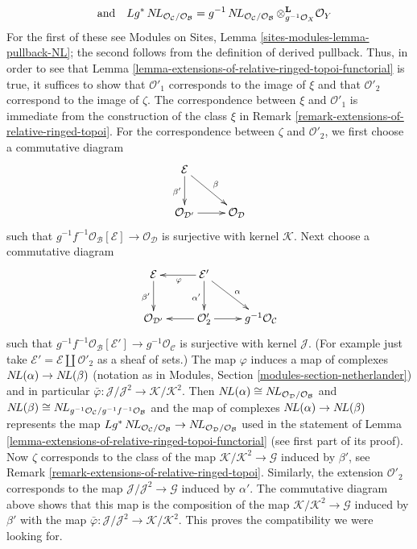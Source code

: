 \begin{remark}
$$\quad\text{and}\quad
Lg^*\mathop{N\!L}\nolimits_{\mathcal{O}_\mathcal{C}/\mathcal{O}_\mathcal{B}} =
g^{-1}\mathop{N\!L}\nolimits_{\mathcal{O}_\mathcal{C}/\mathcal{O}_\mathcal{B}}
\otimes_{g^{-1}\mathcal{O}_X}^\mathbf{L} \mathcal{O}_Y
$$
For the first of these see
Modules on Sites, Lemma \ref{sites-modules-lemma-pullback-NL}; the second
follows from the definition of derived pullback.
Thus, in order to see that
Lemma \ref{lemma-extensions-of-relative-ringed-topoi-functorial}
is true, it suffices to show that $\mathcal{O}'_1$ corresponds
to the image of $\xi$ and that $\mathcal{O}'_2$ correspond to
the image of $\zeta$.
The correspondence between $\xi$ and $\mathcal{O}'_1$
is immediate from the construction of the class $\xi$ in
Remark \ref{remark-extensions-of-relative-ringed-topoi}.
For the correspondence between $\zeta$ and $\mathcal{O}'_2$,
we first choose a commutative diagram
$$
\xymatrix{
\mathcal{E} \ar[d]_{\beta'} \ar[rd]^\beta \\
\mathcal{O}_{\mathcal{D}'} \ar[r] & \mathcal{O}_\mathcal{D}
}
$$
such that $g^{-1}f^{-1}\mathcal{O}_\mathcal{B}[\mathcal{E}] \to
\mathcal{O}_\mathcal{D}$
is surjective with kernel $\mathcal{K}$. Next choose a
commutative diagram
$$
\xymatrix{
\mathcal{E} \ar[d]_{\beta'} &
\mathcal{E}' \ar[l]^\varphi \ar[d]_{\alpha'} \ar[rd]^\alpha \\
\mathcal{O}_{\mathcal{D}'} &
\mathcal{O}'_2 \ar[l] \ar[r] &
g^{-1}\mathcal{O}_\mathcal{C}
}
$$
such that $g^{-1}f^{-1}\mathcal{O}_\mathcal{B}[\mathcal{E}'] \to
g^{-1}\mathcal{O}_\mathcal{C}$
is surjective with kernel $\mathcal{J}$. (For example just take
$\mathcal{E}' = \mathcal{E} \amalg \mathcal{O}'_2$ as a sheaf of sets.)
The map $\varphi$ induces a map of complexes $\mathop{N\!L}\nolimits(\alpha) \to \mathop{N\!L}\nolimits(\beta)$
(notation as in Modules, Section \ref{modules-section-netherlander})
and in particular
$\bar\varphi : \mathcal{J}/\mathcal{J}^2 \to \mathcal{K}/\mathcal{K}^2$.
Then $\mathop{N\!L}\nolimits(\alpha) \cong \mathop{N\!L}\nolimits_{\mathcal{O}_\mathcal{D}/\mathcal{O}_\mathcal{B}}$
and
$\mathop{N\!L}\nolimits(\beta) \cong
\mathop{N\!L}\nolimits_{g^{-1}\mathcal{O}_\mathcal{C}/g^{-1}f^{-1}\mathcal{O}_\mathcal{B}}$
and the map of complexes $\mathop{N\!L}\nolimits(\alpha) \to \mathop{N\!L}\nolimits(\beta)$
represents the map
$Lg^*\mathop{N\!L}\nolimits_{\mathcal{O}_\mathcal{C}/\mathcal{O}_\mathcal{B}} \to
\mathop{N\!L}\nolimits_{\mathcal{O}_\mathcal{D}/\mathcal{O}_\mathcal{B}}$
used in the
statement of Lemma \ref{lemma-extensions-of-relative-ringed-topoi-functorial}
(see first part of its proof). Now $\zeta$ corresponds to the
class of the map $\mathcal{K}/\mathcal{K}^2 \to \mathcal{G}$
induced by $\beta'$, see
Remark \ref{remark-extensions-of-relative-ringed-topoi}.
Similarly, the extension $\mathcal{O}'_2$ corresponds to the map
$\mathcal{J}/\mathcal{J}^2 \to \mathcal{G}$ induced by $\alpha'$.
The commutative diagram above shows that this map is
the composition of the map $\mathcal{K}/\mathcal{K}^2 \to \mathcal{G}$
induced by $\beta'$ with the map
$\bar\varphi : \mathcal{J}/\mathcal{J}^2 \to \mathcal{K}/\mathcal{K}^2$.
This proves the compatibility we were looking for.
\end{remark}

